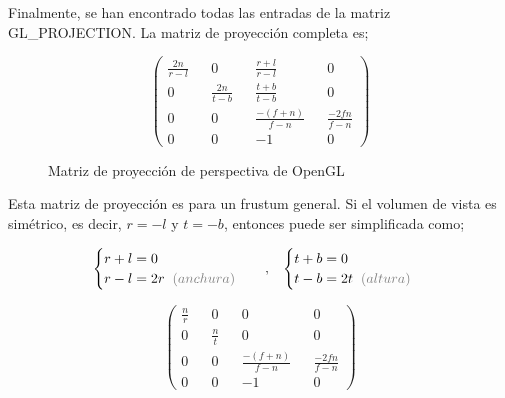 \newpage 
Finalmente, se han encontrado todas las entradas de la matriz GL\_PROJECTION. La matriz de proyección completa es;

\begin{figure} [h]
  \[
  \begin{pmatrix}
    \frac{2n}{r-l} &&              0 &&   \frac{r+l}{r-l} &&                0 \\
                 0 && \frac{2n}{t-b} &&   \frac{t+b}{t-b} &&                0 \\
                 0 &&              0 && \frac{-(f+n)}{f-n} && \frac{-2fn}{f-n} \\
                 0 &&              0 &&                -1 &&                0
  \end{pmatrix}
  \]
  \caption{Matriz de proyección de perspectiva de OpenGL}
\end{figure}

Esta matriz de proyección es para un frustum general. Si el volumen de vista es simétrico, es decir, $r = -l$ y $t = -b$, entonces puede ser simplificada como;

\begin{equation*}
  \begin{cases}
    r+l = 0\\
    r-l = 2r \hspace*{0.2cm} \textcolor{gray}{(anchura)} \\
  \end{cases}
  \hspace*{0.3cm} , \hspace*{0.3cm}
  \begin{cases}
    t+b=0 \\
    t-b=2t \hspace*{0.2cm} \textcolor{gray}{(altura)} \\
  \end{cases}
\end{equation*}

\begin{figure} [h]
  \[
  \begin{pmatrix}
    \frac{n}{r} &&           0 &&                  0 &&                0 \\
              0 && \frac{n}{t} &&                  0 &&                0 \\
              0 &&           0 && \frac{-(f+n)}{f-n} && \frac{-2fn}{f-n} \\
              0 &&           0 &&                 -1 &&                0
  \end{pmatrix}
  \]
\end{figure}

